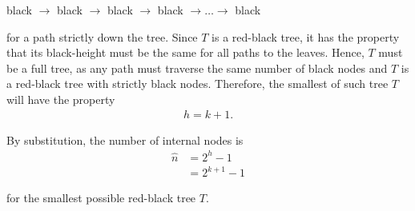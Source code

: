 \documentclass{article}
\begin{document}
\centerline{black $\rightarrow$ black $\rightarrow$ black $\rightarrow$ black $\rightarrow \ldots \rightarrow$ black}

for a path strictly down the tree. Since $T$ is a red-black tree, it has the property that its black-height must be the same for all paths to the leaves. Hence, $T$ must be a full tree, as any path must traverse the same number of black nodes and $T$ is a red-black tree with strictly black nodes. Therefore, the smallest of such tree $T$ will have the property
\begin{align*}
h = k + 1.
\end{align*}

By substitution, the number of internal nodes is
\begin{align*}
\hat{n} &= 2^h - 1\\
&= 2^{k + 1} - 1
\end{align*}

for the smallest possible red-black tree $T$.
\end{document}

